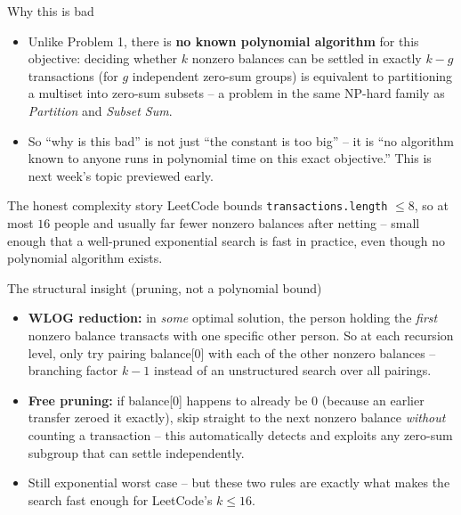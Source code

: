 \documentclass[11pt,aspectratio=169]{beamer}
\begin{document}
\begin{frame}{Why this is bad}
  \begin{itemize}
    \item Unlike Problem 1, there is \textbf{no known polynomial algorithm} for this
    objective: deciding whether $k$ nonzero balances can be settled in exactly
    $k - g$ transactions (for $g$ independent zero-sum groups) is equivalent to
    partitioning a multiset into zero-sum subsets -- a problem in the same
    NP-hard family as \emph{Partition} and \emph{Subset Sum}.
    \item So ``why is this bad'' is not just ``the constant is too big'' -- it is
    ``no algorithm known to anyone runs in polynomial time on this exact objective.''
    This is next week's topic previewed early.
  \end{itemize}
  \begin{alertblock}{The honest complexity story}
    LeetCode bounds \texttt{transactions.length} $\le 8$, so at most $16$ people and
    usually far fewer nonzero balances after netting -- small enough that a
    well-pruned exponential search is fast in practice, even though no polynomial
    algorithm exists.
  \end{alertblock}
\end{frame}

\begin{frame}{The structural insight (pruning, not a polynomial bound)}
  \begin{itemize}
    \item \textbf{WLOG reduction:} in \emph{some} optimal solution, the person holding
    the \emph{first} nonzero balance transacts with one specific other person. So at
    each recursion level, only try pairing balance[0] with each of the other nonzero
    balances -- branching factor $k-1$ instead of an unstructured search over all
    pairings.
    \item \textbf{Free pruning:} if balance[0] happens to already be $0$ (because an
    earlier transfer zeroed it exactly), skip straight to the next nonzero balance
    \emph{without} counting a transaction -- this automatically detects and exploits
    any zero-sum subgroup that can settle independently.
    \item Still exponential worst case -- but these two rules are exactly what makes
    the search fast enough for LeetCode's $k \le 16$.
  \end{itemize}
\end{frame}
\end{document}
